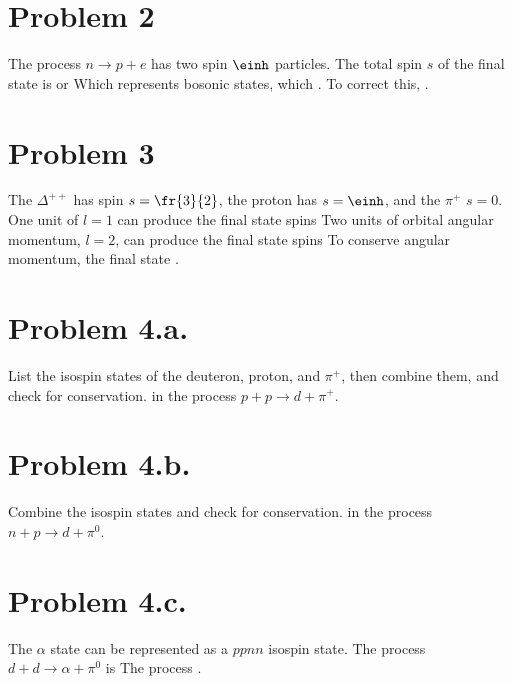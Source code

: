 \documentclass{article}
\begin{document}
\section*{Problem 2}
The process $n\rightarrow p+e$ has two spin $\einh$ particles. The total spin $s$ of the final state is
or
Which represents bosonic states, which . To correct this, . 
\section*{Problem 3}
The $\Delta^{++}$ has spin $s=\fr{3}{2}$, the proton has $s=\einh$, and the $\pi^{+}$ $s=0$. One unit of $l=1$ can produce the final state spins
Two units of orbital angular momentum, $l=2$, can produce the final state spins
To conserve angular momentum, the final state .
\section*{Problem 4.a.}
List the isospin states of the deuteron, proton, and $\pi^{+}$, then combine them, and check for conservation.
 in the process $p+p \rightarrow d + \pi^{+}$.
\section*{Problem 4.b.}
Combine the isospin states and check for conservation.
 in the process $n+p \rightarrow d + \pi^{0}$.
\section*{Problem 4.c.}
The $\alpha$ state can be represented as a $ppnn$ isospin state.
The process $d + d\rightarrow \alpha + \pi^{0}$ is
The process .
\end{document}
